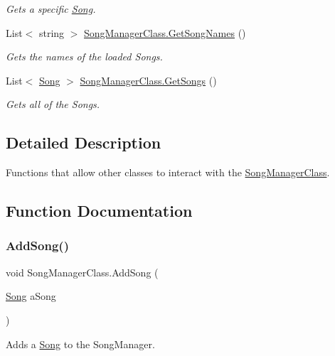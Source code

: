 \begin{DoxyCompactItemize}
\begin{DoxyCompactList}\small\item\em Gets a specific \hyperlink{class_song}{Song}. \end{DoxyCompactList}\item 
List$<$ string $>$ \hyperlink{group___s_m_pub_func_ga2a9455a763e35cfb6b242a82f7d797ae}{Song\+Manager\+Class.\+Get\+Song\+Names} ()
\begin{DoxyCompactList}\small\item\em Gets the names of the loaded Songs. \end{DoxyCompactList}\item 
List$<$ \hyperlink{class_song}{Song} $>$ \hyperlink{group___s_m_pub_func_ga3bf6a6d42a7c5e94cc85ba10eb9e6edb}{Song\+Manager\+Class.\+Get\+Songs} ()
\begin{DoxyCompactList}\small\item\em Gets all of the Songs. \end{DoxyCompactList}\end{DoxyCompactItemize}


\subsection{Detailed Description}
Functions that allow other classes to interact with the \hyperlink{class_song_manager_class}{Song\+Manager\+Class}. 

\subsection{Function Documentation}
\mbox{\label{group___s_m_pub_func_ga1a228cb2a64e55448ccf9d1d618f05b7}} 
\subsubsection{\texorpdfstring{Add\+Song()}{AddSong()}}
{\footnotesize\ttfamily void Song\+Manager\+Class.\+Add\+Song (\begin{DoxyParamCaption}\item[{\hyperlink{class_song}{Song}}]{a\+Song }\end{DoxyParamCaption})}



Adds a \hyperlink{class_song}{Song} to the Song\+Manager. 



